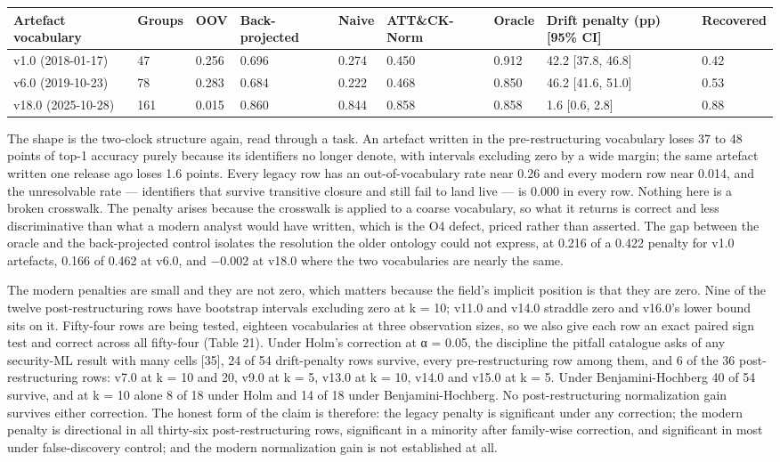 \documentclass[11pt,a4paper]{article}
\begin{document}
\begin{center}\footnotesize
\begin{tabular}{lllllllll}
\toprule
Artefact vocabulary & Groups & OOV & Back-projected & Naive & ATT\&CK-Norm & Oracle & Drift penalty (pp) [95\% CI] & Recovered \\
\midrule
v1.0 (2018-01-17) & 47 & 0.256 & 0.696 & 0.274 & 0.450 & 0.912 & 42.2 [37.8, 46.8] & 0.42 \\
v6.0 (2019-10-23) & 78 & 0.283 & 0.684 & 0.222 & 0.468 & 0.850 & 46.2 [41.6, 51.0] & 0.53 \\
v18.0 (2025-10-28) & 161 & 0.015 & 0.860 & 0.844 & 0.858 & 0.858 & 1.6 [0.6, 2.8] & 0.88 \\
\bottomrule
\end{tabular}
\end{center}

The shape is the two-clock structure again, read through a task. An artefact written in the pre-restructuring vocabulary loses 37 to 48 points of top-1 accuracy purely because its identifiers no longer denote, with intervals excluding zero by a wide margin; the same artefact written one release ago loses 1.6 points. Every legacy row has an out-of-vocabulary rate near 0.26 and every modern row near 0.014, and the unresolvable rate — identifiers that survive transitive closure and still fail to land live — is 0.000 in every row. Nothing here is a broken crosswalk. The penalty arises because the crosswalk is applied to a coarse vocabulary, so what it returns is correct and less discriminative than what a modern analyst would have written, which is the O4 defect, priced rather than asserted. The gap between the oracle and the back-projected control isolates the resolution the older ontology could not express, at 0.216 of a 0.422 penalty for v1.0 artefacts, 0.166 of 0.462 at v6.0, and −0.002 at v18.0 where the two vocabularies are nearly the same.

The modern penalties are small and they are not zero, which matters because the field's implicit position is that they are zero. Nine of the twelve post-restructuring rows have bootstrap intervals excluding zero at k = 10; v11.0 and v14.0 straddle zero and v16.0's lower bound sits on it. Fifty-four rows are being tested, eighteen vocabularies at three observation sizes, so we also give each row an exact paired sign test and correct across all fifty-four (Table 21). Under Holm's correction at α = 0.05, the discipline the pitfall catalogue asks of any security-ML result with many cells [35], 24 of 54 drift-penalty rows survive, every pre-restructuring row among them, and 6 of the 36 post-restructuring rows: v7.0 at k = 10 and 20, v9.0 at k = 5, v13.0 at k = 10, v14.0 and v15.0 at k = 5. Under Benjamini-Hochberg 40 of 54 survive, and at k = 10 alone 8 of 18 under Holm and 14 of 18 under Benjamini-Hochberg. No post-restructuring normalization gain survives either correction. The honest form of the claim is therefore: the legacy penalty is significant under any correction; the modern penalty is directional in all thirty-six post-restructuring rows, significant in a minority after family-wise correction, and significant in most under false-discovery control; and the modern normalization gain is not established at all.
\end{document}
